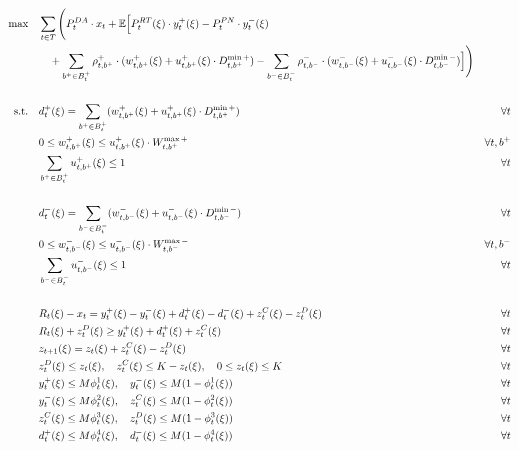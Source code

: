 \documentclass[10pt]{article}
\begin{document}
\begin{subequations}
    \begin{align}
        \text{max} \quad & \sum_{t\in T} \Bigg( P_t^{DA} \cdot x_t 
        + \mathbb{E} \Big[ P_t^{RT}(\xi) \cdot y_t^+(\xi) - P_t^{PN} \cdot y_t^-(\xi) & \notag \\
        &\quad + \sum_{b^+ \in B^+_t} \rho^+_{t,b^+} \cdot (w^+_{t,b^+}(\xi) + u^+_{t,b^+}(\xi) \cdot D^{\min+}_{t,b^+}) 
        - \sum_{b^- \in B^-_t} \rho^-_{t,b^-} \cdot (w^-_{t,b^-}(\xi) + u^-_{t,b^-}(\xi) \cdot D^{\min-}_{t,b^-}) \Big] \Bigg) & \\
        &&\notag\\
        \text{s.t.} \quad & d^{+}_{t}(\xi) = \sum_{b^+ \in B^+_t} (w^+_{t,b^+}(\xi) + u^+_{t,b^+}(\xi) \cdot D^{\min+}_{t,b^+})& \forall t \\
        & 0 \leq w^+_{t,b^+}(\xi) \leq u^+_{t,b^+}(\xi) \cdot W^{\max+}_{t,b^+}&\forall t, b^+\\
        & \sum_{b^+ \in B^+_t} u^+_{t,b^+}(\xi) \leq 1 &\forall t\\
        &&\notag\\
        & d^{-}_{t}(\xi) = \sum_{b^- \in B^-_t} (w^-_{t,b^-}(\xi) + u^-_{t,b^-}(\xi) \cdot D^{\min-}_{t,b^-})&\forall t\\
        & 0 \leq w^-_{t,b^-}(\xi) \leq u^-_{t,b^-}(\xi) \cdot W^{\max-}_{t,b^-}&\forall t, b^-\\
        & \sum_{b^- \in B^-_t} u^-_{t,b^-}(\xi) \leq 1 & \forall t\\
        &&\notag\\
        & R_{t}(\xi) - x_{t} = y_{t}^{+}(\xi) - y_{t}^{-}(\xi) + d^+_{t}(\xi) -  d^-_{t}(\xi) + z^C_{t}(\xi) - z^D_{t}(\xi) & \forall t\\
        & R_{t}(\xi) + z^D_{t}(\xi) \geq y^+_t(\xi) + d^+_{t}(\xi) + z^C_{t}(\xi) & \forall t\\
        & z_{t+1}(\xi) = z_{t}(\xi) + z^C_{t}(\xi) - z^D_{t}(\xi) &\forall t \\
        & z^D_{t}(\xi) \le z_{t}(\xi), \quad z^C_{t}(\xi) \le K - z_{t}(\xi), \quad 0 \leq z_{t}(\xi) \leq K & \forall t\\
        & y^+_{t}(\xi) \leq M \phi^1_{t}(\xi), \quad y^-_{t}(\xi) \leq M (1 - \phi^1_{t}(\xi)) & \forall t\\
        & y^-_{t}(\xi) \leq M \phi^2_{t}(\xi), \quad z^C_{t}(\xi) \leq M (1 - \phi^2_{t}(\xi)) & \forall t\\
        & z^C_{t}(\xi) \leq M \phi^3_{t}(\xi), \quad z^D_{t}(\xi) \leq M (1 - \phi^3_{t}(\xi)) & \forall t\\
        & d^+_{t}(\xi) \leq M \phi^4_{t}(\xi), \quad d^-_{t}(\xi) \leq M (1 - \phi^4_{t}(\xi)) & \forall t
    \end{align}
\end{subequations}
\end{document}
